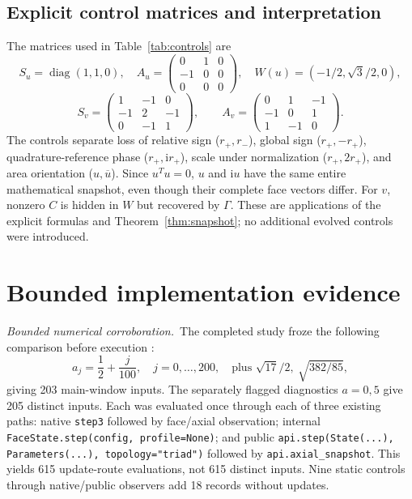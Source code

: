 \documentclass[11pt,a4paper]{article}
\newcommand{\ii}{\mathrm i}\newcommand{\tr}{\operatorname{tr}}
\newcommand{\diag}{\operatorname{diag}}\newcommand{\Argz}{\operatorname{Arg}_0}
\newcommand{\bounded}{\textit{Bounded numerical corroboration.}}
\begin{document}
\subsection{Explicit control matrices and interpretation}
The matrices used in Table~\ref{tab:controls} are
\begin{equation}
S_u=\diag(1,1,0),\quad
A_u=\begin{pmatrix}0&1&0\\-1&0&0\\0&0&0\end{pmatrix},\quad
W(u)=(-1/2,\sqrt3/2,0),\label{eq:u}
\end{equation}
\begin{equation}
S_v=\begin{pmatrix}1&-1&0\\-1&2&-1\\0&-1&1\end{pmatrix},\qquad
A_v=\begin{pmatrix}0&1&-1\\-1&0&1\\1&-1&0\end{pmatrix}.\label{eq:v}
\end{equation}
The controls separate loss of relative sign ($r_+,r_-$), global sign ($r_+,-r_+$), quadrature-reference phase ($r_+,\ii r_+$), scale under normalization ($r_+,2r_+$), and area orientation ($u,\overline u$). Since $u^Tu=0$, $u$ and $\ii u$ have the same entire mathematical snapshot, even though their complete face vectors differ. For $v$, nonzero $C$ is hidden in $W$ but recovered by $\Gamma$. These are applications of the explicit formulas and Theorem~\ref{thm:snapshot}; no additional evolved controls were introduced.

\section{Bounded implementation evidence}\label{sec:evidence}
\bounded\ The completed study froze the following comparison before execution \cite{sgo01}:
\begin{equation}
a_j=\frac12+\frac j{100},\quad j=0,\ldots,200,
\quad\text{plus }\sqrt{17}/2,\ \sqrt{382/85},\label{eq:grid}
\end{equation}
giving 203 main-window inputs. The separately flagged diagnostics $a=0,5$ give 205 distinct inputs. Each was evaluated once through each of three existing paths: native \texttt{step3} followed by face/axial observation; internal \texttt{FaceState.step(config, profile=None)}; and public \texttt{api.step(State(...), Parameters(...), topology="triad")} followed by \texttt{api.axial\_snapshot}. This yields 615 update-route evaluations, not 615 distinct inputs. Nine static controls through native/public observers add 18 records without updates.
\end{document}

